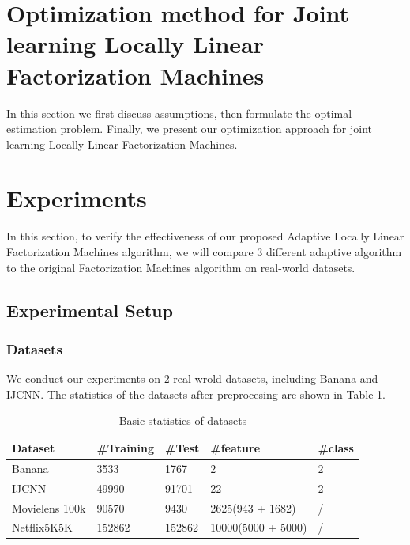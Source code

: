 \documentclass{article}
\begin{document}
\section{Optimization method for Joint learning Locally Linear Factorization Machines}
In this section we first discuss assumptions, then formulate the optimal estimation problem. Finally, we present our optimization approach for joint learning Locally Linear Factorization Machines.

\section{Experiments}
In this section, to verify the effectiveness of our proposed Adaptive Locally Linear Factorization Machines algorithm, we will compare 3 different adaptive algorithm to the original Factorization Machines algorithm on real-world datasets.
\subsection{Experimental Setup}
\subsubsection{Datasets}
We conduct our experiments on 2 real-wrold datasets, including Banana and IJCNN. The statistics of the datasets after preprocesing are shown in Table 1.
\begin{table}
	\centering
	\begin{tabu} to \textwidth {|X[c]| X[c]| X[c]| X[c]| X[c]|}
		\hline
		Dataset              & \#Training & \#Test & \#feature &\#class\\
		\hline
		Banana 		   		& 3533 		& 1767 	& 2 	& 2  \\
		IJCNN           	& 49990 	& 91701 & 22 	& 2  \\
		Movielens 100k       & 90570 	& 9430 & 2625(943 + 1682) 	& /  \\
		Netflix5K5K       & 152862 	& 152862 & 10000(5000 + 5000) 	& /  \\
		\hline
	\end{tabu}
	\caption{Basic statistics of datasets}
\end{table}
\end{document}
